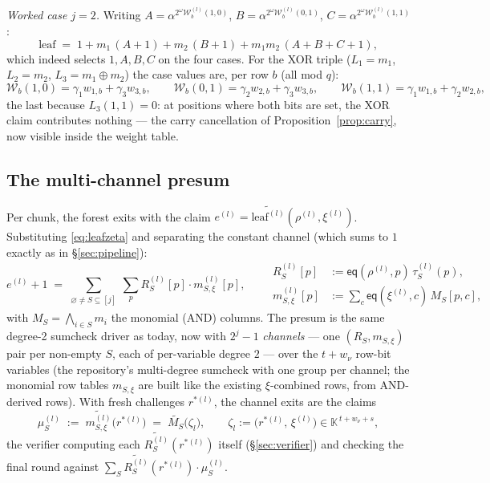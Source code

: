 \documentclass[11pt]{article}
\newcommand{\K}{\mathbb{K}}            %
\newcommand{\mle}[1]{\widetilde{#1}}
\newcommand{\eq}{\mathsf{eq}}
\newcommand{\Wc}{\mathcal{W}}          %
\theoremstyle{plain}
\theoremstyle{definition}
\theoremstyle{remark}
\begin{document}
\noindent\emph{Worked case $j=2$.} Writing
$A=\alpha^{2^{\omega}\Wc^{(l)}_b(1,0)}$, $B=\alpha^{2^{\omega}\Wc^{(l)}_b(0,1)}$,
$C=\alpha^{2^{\omega}\Wc^{(l)}_b(1,1)}$:
\[
  \mathrm{leaf} \;=\; 1 + m_1\,(A+1) + m_2\,(B+1) + m_1m_2\,(A+B+C+1) ,
\]
which indeed selects $1,A,B,C$ on the four cases. For the XOR triple
($L_1=m_1$, $L_2=m_2$, $L_3=m_1\oplus m_2$) the case values are, per row $b$
(all mod $q$):
\[
  \Wc_b(1,0)=\gamma_1w_{1,b}+\gamma_3w_{3,b},\qquad
  \Wc_b(0,1)=\gamma_2w_{2,b}+\gamma_3w_{3,b},\qquad
  \Wc_b(1,1)=\gamma_1w_{1,b}+\gamma_2w_{2,b},
\]
the last because $L_3(1,1)=0$: at positions where both bits are set, the XOR
claim contributes nothing --- the carry cancellation of
Proposition~\ref{prop:carry}, now visible inside the weight table.

\subsection{The multi-channel presum}\label{sec:presum}

Per chunk, the forest exits with the claim
$e^{(l)} = \mle{\mathrm{leaf}^{(l)}}(\rho^{(l)},\xi^{(l)})$. Substituting
\eqref{eq:leafzeta} and separating the constant channel (which sums to $1$
exactly as in \S\ref{sec:pipeline}):
\begin{equation}\label{eq:presumid}
  e^{(l)} + 1 \;=\;
  \sum_{\varnothing\ne S\subseteq[j]}\ \sum_{p}
     R^{(l)}_S[p]\cdot m^{(l)}_{S,\xi}[p],
  \qquad
  \begin{aligned}
    R^{(l)}_S[p] &:= \eq(\rho^{(l)},p)\,\tau^{(l)}_S(p),\\
    m^{(l)}_{S,\xi}[p] &:= \textstyle\sum_{c}\eq(\xi^{(l)},c)\,M_S[p,c],
  \end{aligned}
\end{equation}
with $M_S=\bigwedge_{i\in S}m_i$ the monomial (AND) columns. The presum is the
same degree-2 sumcheck driver as today, now with $2^{j}-1$
\emph{channels} --- one $(R_S, m_{S,\xi})$ pair per non-empty $S$, each of
per-variable degree $2$ --- over the $t+w_\nu$ row-bit variables
(the repository's multi-degree sumcheck with one group per channel; the
monomial row tables $m_{S,\xi}$ are built like the existing
$\xi$-combined rows, from AND-derived rows). With fresh challenges
$r^{*(l)}$, the channel exits are the claims
\[
  \mu^{(l)}_S \;:=\; \mle{m^{(l)}_{S,\xi}}\bigl(r^{*(l)}\bigr)
  \;=\; \mle{M_S}\bigl(\zeta_l\bigr),
  \qquad
  \zeta_l := \bigl(r^{*(l)},\,\xi^{(l)}\bigr)\in\K^{\,t+w_\nu+s},
\]
the verifier computing each $\mle{R^{(l)}_S}(r^{*(l)})$ itself
(\S\ref{sec:verifier}) and checking the final round against
$\sum_S \mle{R^{(l)}_S}(r^{*(l)})\cdot\mu^{(l)}_S$.
\end{document}
